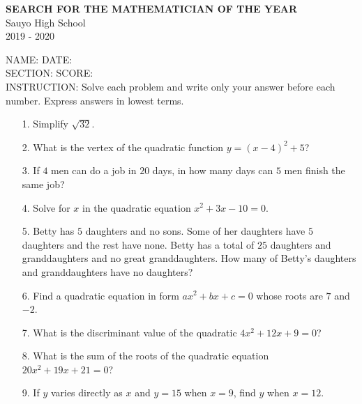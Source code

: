 \documentclass[12pt,letterpaper]{article}
\begin{document}
\begin{center}
\textbf{SEARCH FOR THE MATHEMATICIAN OF THE YEAR}\\
Sauyo High School\\
2019 - 2020
\end{center}
\noindent NAME: \underline{\hspace{5.6cm}} \hfill DATE: \underline{\hspace{3cm}}
\\
\noindent SECTION: \underline{\hspace{5cm}} \hfill SCORE: \underline{\hspace{2.75cm}}
\\
INSTRUCTION: Solve each problem and write only your answer before each number. Express answers in lowest terms.
\begin{enumerate}
\item[\underline{\hspace{1.5cm}}1.] Simplify $\sqrt{32}$.
\item [\underline{\hspace{1.5cm}}2.]What is the vertex of the quadratic function $y=(x-4)^2+5$?   
\item [\underline{\hspace{1.5cm}}3.]If $4$ men can do a job in $20$ days, in how many days can $5$ men finish the same job?
\item [\underline{\hspace{1.5cm}}4.]Solve for $x$ in the quadratic equation $x^2+3x-10=0$.
\item [\underline{\hspace{1.5cm}}5.]Betty has $5$ daughters and no sons. Some of her daughters have $5$ daughters and the rest have none. Betty has a total of $25$ daughters and granddaughters and no great granddaughters. How many of Betty's daughters and granddaughters have no daughters?
\item [\underline{\hspace{1.5cm}}6.]Find a quadratic equation in form $ax^2+bx+c=0$ whose roots are $7$ and $-2$.
\item [\underline{\hspace{1.5cm}}7.]What is the discriminant value of the quadratic $4x^2+12x+9=0$?
\item [\underline{\hspace{1.5cm}}8.]What is the sum of the roots of the quadratic equation $20x^2+19x+21=0$?
\item [\underline{\hspace{1.5cm}}9.]If $y$ varies directly as $x$ and $y=15$ when $x=9$, find $y$ when $x=12$.

\end{enumerate}
\end{document}
